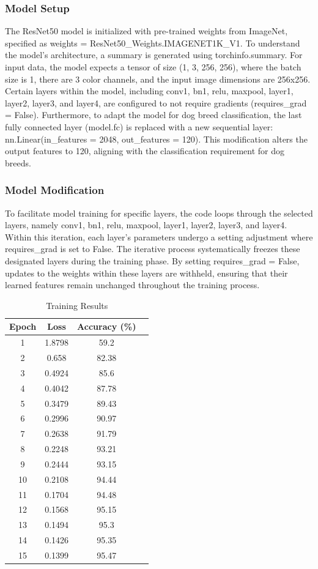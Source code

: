 \subsubsection{Model Setup}
The ResNet50 model is initialized with pre-trained weights from ImageNet, specified as weights = ResNet50\_Weights.IMAGENET1K\_V1. To understand the model's architecture, a summary is generated using torchinfo.summary. For input data, the model expects a tensor of size (1, 3, 256, 256), where the batch size is 1, there are 3 color channels, and the input image dimensions are 256x256. Certain layers within the model, including conv1, bn1, relu, maxpool, layer1, layer2, layer3, and layer4, are configured to not require gradients (requires\_grad = False). Furthermore, to adapt the model for dog breed classification, the last fully connected layer (model.fc) is replaced with a new sequential layer: nn.Linear(in\_features = 2048, out\_features = 120). This modification alters the output features to 120, aligning with the classification requirement for dog breeds.

\subsubsection{Model Modification} 
To facilitate model training for specific layers, the code loops through the selected layers, namely conv1, bn1, relu, maxpool, layer1, layer2, layer3, and layer4. Within this iteration, each layer's parameters undergo a setting adjustment where requires\_grad is set to False.
The iterative process systematically freezes these designated layers during the training phase. By setting requires\_grad = False, updates to the weights within these layers are withheld, ensuring that their learned features remain unchanged throughout the training process.
\vspace{1cm}
\begin{table}[ht]
    \centering
    \caption{Training Results}
    \label{tab:training_results}
    \begin{tabular}{|c|c|c|c|}
    \toprule
    \textbf{Epoch} & \textbf{Loss} & \textbf{Accuracy (\%)} \\
    \midrule
    1 & 1.8798 & 59.2 \\
    2 & 0.658 & 82.38 \\
    3 & 0.4924 & 85.6 \\
    4 & 0.4042 & 87.78 \\
    5 & 0.3479 & 89.43 \\
    6 & 0.2996 & 90.97 \\
    7 & 0.2638 & 91.79 \\
    8 & 0.2248 & 93.21 \\
    9 & 0.2444 & 93.15 \\
    10 & 0.2108 & 94.44 \\
    11 & 0.1704 & 94.48 \\
    12 & 0.1568 & 95.15 \\
    13 & 0.1494 & 95.3 \\
    14 & 0.1426 & 95.35 \\
    15 & 0.1399 & 95.47 \\
    \bottomrule
    \end{tabular}
    \end{table}
\newpage
